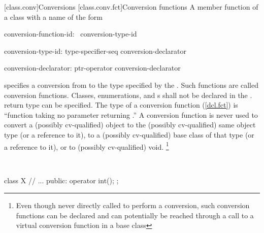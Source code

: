 \documentclass[american]{book}
\begin{document}
\begin{paras}
\setcounter{section}{2}
[class.conv]{Conversions}
\setcounter{subsection}{1}
[class.conv.fct]{Conversion functions}
\pnum
{}%
%
%
%
A member function of a class
with a name of the form

\begin{bnf}
%
conversion-function-id:\br
	\ conversion-type-id
\end{bnf}

\begin{bnf}
conversion-type-id:\br
	type-specifier-seq conversion-declarator\opt
\end{bnf}

\begin{bnf}
conversion-declarator:\br
	ptr-operator conversion-declarator\opt
\end{bnf}

specifies a conversion from
to the type specified by the
.
Such  functions are called conversion functions.
Classes, enumerations, and
s
shall not be declared in the
.
 return type can be specified.
%
The type of a conversion function (\ref{dcl.fct}) is
``function taking no parameter  returning
.''
A conversion function is never used to convert a (possibly cv-qualified) object
to the (possibly cv-qualified) same object type (or a reference to it),
to a (possibly cv-qualified) base class of that type (or a reference to it),
or to (possibly cv-qualified) void.%
\footnote{
Even though never directly called to perform a conversion,
such conversion functions can be declared and can potentially
be reached through a call to a virtual conversion function in a base class
}

\enterexample\ 

\begin{codeblock}
class X {
    // ...
public:
    operator int();
};


\end{codeblock}
\end{paras}
\end{document}
